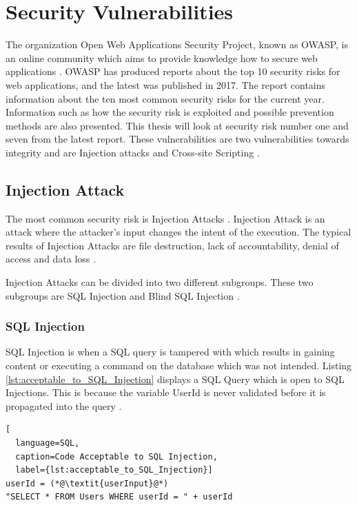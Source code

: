 \section{Security Vulnerabilities}
\label{SecurityVulnerabilities}
The organization Open Web Applications Security Project, known as OWASP, is an online community which aims to provide knowledge how to secure web applications \parencite{OpenWebApplicationSecurityProject}. OWASP has produced reports about the top 10 security risks for web applications, and the latest was published in 2017. The report contains information about the ten most common security risks for the current year. Information such as how the security risk is exploited and possible prevention methods are also presented. This thesis will look at security risk number one and seven from the latest report. These vulnerabilities are two vulnerabilities towards integrity and are Injection attacks and Cross-site Scripting \parencite{OWASP2017}.



\subsection{Injection Attack}
The most common security risk is Injection Attacks \parencite{OWASP2017}. Injection Attack is an attack where the attacker's input changes the intent of the execution. The typical results of Injection Attacks are file destruction, lack of accountability, denial of access and data loss \parencite{Secure_Web}.

Injection Attacks can be divided into two different subgroups. These two subgroups are SQL Injection and Blind SQL Injection \parencite{Secure_Web}.



\subsubsection{SQL Injection}
SQL Injection is when a SQL query is tampered with which results in gaining content or executing a command on the database which was not intended. Listing \ref{lst:acceptable_to_SQL_Injection} displays a SQL Query which is open to SQL Injections. This is because the variable UserId is never validated before it is propagated into the query \parencite{JustinClarke-Salt2009SIAa, Secure_Web}.

\hfill
\begin{lstlisting}[
  language=SQL,
  caption=Code Acceptable to SQL Injection,
  label={lst:acceptable_to_SQL_Injection}]
userId = (*@\textit{userInput}@*)
"SELECT * FROM Users WHERE userId = " + userId
\end{lstlisting}
\hfill

